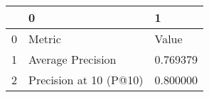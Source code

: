 \begin{tabular}{lll}
\toprule
 & 0 & 1 \\
\midrule
0 & Metric & Value \\
1 & Average Precision & 0.769379 \\
2 & Precision at 10 (P@10) & 0.800000 \\
\bottomrule
\end{tabular}
